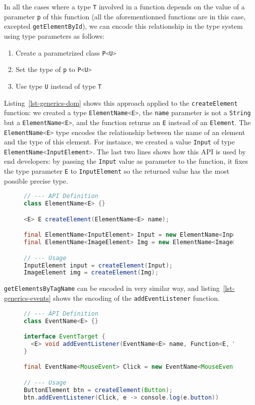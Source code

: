 \documentclass{llncs}
\newcommand{\jscode}[1]{\lstinline[language=JavaScript]|#1|}
\newcommand{\scalacode}[1]{\lstinline[language=Scala]|#1|}
\begin{document}
In all the cases where a type \scalacode{T} involved in a function depends on the value of a parameter \scalacode{p} of this function (all the aforementionned functions are in this case, excepted \jscode{getElementById}), we can encode this relationship in the type system using type parameters as follows:

\begin{enumerate}
 \item Create a parametrized class \scalacode{P<U>}
 \item Set the type of \scalacode{p} to \scalacode{P<U>}
 \item Use type \scalacode{U} instead of type \scalacode{T}
\end{enumerate}

Listing~\ref{lst-generics-dom} shows this approach applied to the \jscode{createElement} function: we created a type \scalacode{ElementName<E>}, the \scalacode{name} parameter is not a \scalacode{String} but a \scalacode{ElementName<E>}, and the function returns an \scalacode{E} instead of an \scalacode{Element}. The \scalacode{ElementName<E>} type encodes the relationship between the name of an element and the type of this element. For instance, we created a value \scalacode{Input} of type \scalacode{ElementName<InputElement>}. The last two lines shows how this API is used by end developers: by passing the \scalacode{Input} value as parameter to the function, it fixes the type parameter \scalacode{E} to \scalacode{InputElement} so the returned value has the most possible precise type.

\begin{figure}
\begin{lstlisting}[label=lst-generics-dom,language=java]
// --- API Definition
class ElementName<E> {}

<E> E createElement(ElementName<E> name);

final ElementName<InputElement> Input = new ElementName<InputElement>();
final ElementName<ImageElement> Img = new ElementName<ImageElement>();

// --- Usage
InputElement input = createElement(Input);
ImageElement img = createElement(Img);
\end{lstlisting}
\end{figure}

\scalacode{getElementsByTagName} can be encoded in very similar way, and listing~\ref{lst-generics-events} shows the encoding of the \jscode{addEventListener} function.

\begin{figure}
\begin{lstlisting}[label=lst-generics-events,language=java]
// --- API Definition
class EventName<E> {}

interface EventTarget {
  <E> void addEventListener(EventName<E> name, Function<E, Void> callback);
}

final EventName<MouseEvent> Click = new EventName<MouseEvent>();

// --- Usage
ButtonElement btn = createElement(Button);
btn.addEventListener(Click, e -> console.log(e.button))
\end{lstlisting}
\end{figure}
\end{document}
